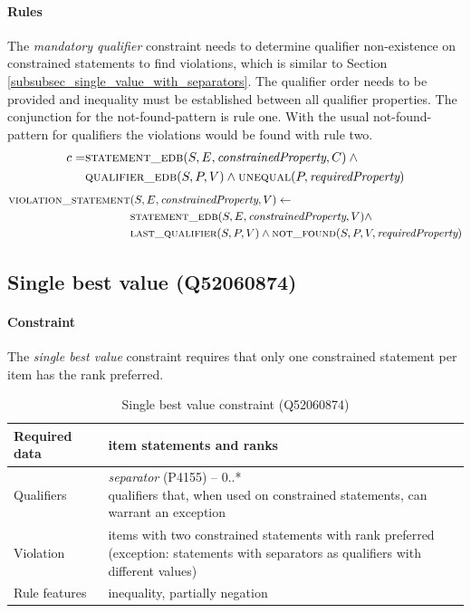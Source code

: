 \documentclass[hyperref,bachelorofscience,fleqn]{cgvpub}
\begin{document}
\paragraph{Rules}
The \emph{mandatory qualifier} constraint needs to determine qualifier non-existence on constrained statements to find violations, which is similar to Section \ref{subsubsec_single_value_with_separators}. The qualifier order needs to be provided and inequality must be established between all qualifier properties. The conjunction for the not-found-pattern is rule one. With the usual not-found-pattern for qualifiers the violations would be found with rule two.
\begin{align}
\begin{split}
c = &\textsc{statement\_edb}(S, E, \emph{constrainedProperty}, C) \wedge{} \\
&\textsc{qualifier\_edb}(S, P, V) \wedge \textsc{unequal}(P, \emph{requiredProperty})
\end{split}
\end{align}
\begin{align}
\begin{split}
\textsc{violation\_statement}&(S, E, \emph{constrainedProperty}, V) \leftarrow \\
&\textsc{statement\_edb}(S, E, \emph{constrainedProperty}, V) \wedge \\
&\textsc{last\_qualifier}(S, P, V) \wedge \textsc{not\_found}(S, P, V, \emph{requiredProperty})
\end{split}
\end{align}

\subsection{Single best value (Q52060874)}\label{subsec_single_best_value}
\paragraph{Constraint}
The \emph{single best value} constraint requires that only one constrained statement per item has the rank preferred.

\begin{table}[H]
\caption{Single best value constraint (Q52060874)}
\begin{tabularx}{\textwidth}{ ll X}
\hline
Required data & item statements and ranks \\
\hline
Qualifiers & \makecell{\emph{separator} (P4155) -- 0..* \\ qualifiers that, when used on constrained statements, can warrant an exception } \\
\hline
Violation & \makecell{items with two constrained statements with rank preferred \\ (exception: statements with separators as qualifiers with different values)} \\
\hline
Rule features & inequality, partially negation \\
\hline
\end{tabularx}
\end{table}
\end{document}
